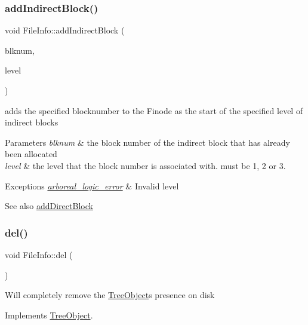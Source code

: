 \subsubsection{\texorpdfstring{add\+Indirect\+Block()}{addIndirectBlock()}}
{\footnotesize\ttfamily void File\+Info\+::add\+Indirect\+Block (\begin{DoxyParamCaption}\item[{Blk\+Num\+Type}]{blknum,  }\item[{short}]{level }\end{DoxyParamCaption})}

adds the specified blocknumber to the Finode as the start of the specified level of indirect blocks 
\begin{DoxyParams}{Parameters}
{\em blknum} & the block number of the indirect block that has already been allocated \\
\hline
{\em level} & the level that the block number is associated with. must be 1, 2 or 3. \\
\hline
\end{DoxyParams}

\begin{DoxyExceptions}{Exceptions}
{\em \mbox{\hyperlink{classarboreal__logic__error}{arboreal\+\_\+logic\+\_\+error}}} & Invalid level \\
\hline
\end{DoxyExceptions}
\begin{DoxySeeAlso}{See also}
\mbox{\hyperlink{classFileInfo_a83e728ab41847e3b0d4eee9c98b89965}{add\+Direct\+Block}} 
\end{DoxySeeAlso}
\mbox{\label{classFileInfo_a2ca34d945ed1208f227a249ba72ee427}} 
\subsubsection{\texorpdfstring{del()}{del()}}
{\footnotesize\ttfamily void File\+Info\+::del (\begin{DoxyParamCaption}{ }\end{DoxyParamCaption})\hspace{0.3cm}{\ttfamily [virtual]}}

Will completely remove the \mbox{\hyperlink{classTreeObject}{Tree\+Object}}\textquotesingle{}s presence on disk 

Implements \mbox{\hyperlink{classTreeObject_af390b7479aa972888e594c07a85740b6}{Tree\+Object}}.

